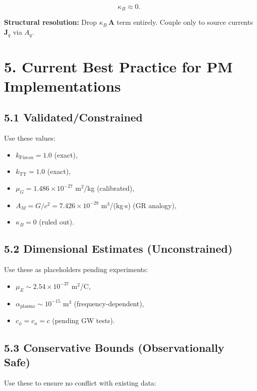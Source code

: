 \documentclass{article}
\begin{document}
\[
\kappa_B \approx 0.
\]



\textbf{Structural resolution:} Drop $\kappa_B\,\mathbf A$ term entirely. Couple
only to source currents $\mathbf J_q$ via $A_q$.

\section*{5. Current Best Practice for PM Implementations}

\subsection*{5.1 Validated/Constrained}

Use these values:

\begin{itemize}
    \item $k_{\text{Fizeau}} = 1.0$ (exact),
    \item $k_{\text{TT}} = 1.0$ (exact),
    \item $\mu_G = 1.486 \times 10^{-27}$ m$^2$/kg (calibrated),
    \item $A_M = G / c^2 = 7.426 \times 10^{-28}$ m$^3$/(kg$\cdot$s) (GR analogy),
    \item $\kappa_B = 0$ (ruled out).
\end{itemize}

\subsection*{5.2 Dimensional Estimates (Unconstrained)}

Use these as placeholders pending experiments:

\begin{itemize}
    \item $\mu_E \sim 2.54 \times 10^{-37}$ m$^2$/C,
    \item $\alpha_{\text{plasma}} \sim 10^{-15}$ m$^3$ (frequency-dependent),
    \item $c_\phi = c_u = c$ (pending GW tests).
\end{itemize}

\subsection*{5.3 Conservative Bounds (Observationally Safe)}

Use these to ensure no conflict with existing data:
\end{document}
